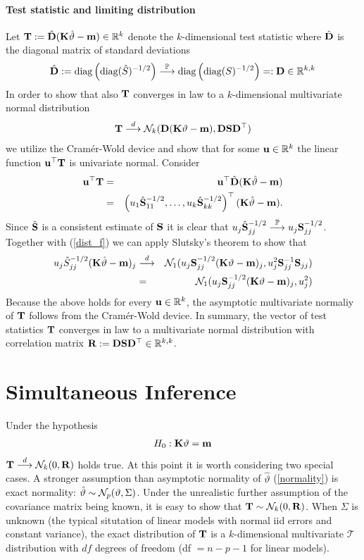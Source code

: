 \documentclass[12pt]{article}
\begin{document}
\paragraph{Test statistic and limiting distribution}

Let $\T := \hat{\D} (\K \hat{\vartheta} - \m) \in \R^k$ denote
the $k$-dimensional test statistic where $\hat{\D}$ is the diagonal
matrix of standard deviations
\begin{eqnarray*}
\hat{\D} := \text{diag}\left(\text{diag}(\hat{S})^{-1/2}\right) \cP 
\text{diag}\left(\text{diag}(S)^{-1/2}\right) =: \D \in \R^{k,k}
\end{eqnarray*}
In order to show that also $\T$ converges in law to a $k$-dimensional multivariate
normal distribution
\begin{eqnarray*}
\T \cL \N_k(\D(\K \vartheta - \m), \D \S \D^\top)
\end{eqnarray*}
we utilize the Cram{\'e}r-Wold device and show that for some $\u \in \R^k$ 
the linear function $\u^\top \T$ is univariate normal. Consider
\begin{eqnarray*}
\u^\top \T & = & \u^\top \hat{\D} (\K \hat{\vartheta} - \m) \\
& = & \left(u_1 \hat{\S}_{11}^{-1/2}, \dots, u_k \hat{\S}_{kk}^{-1/2}\right)^\top(\K \hat{\vartheta} - \m).
\end{eqnarray*}
Since $\hat{\S}$ is a consistent estimate of $\S$ it 
is clear that $u_j \hat{\S}_{jj}^{-1/2} \cP u_j \S_{jj}^{-1/2}$.
Together with (\ref{dist_f}) we can apply Slutsky's theorem to show that
\begin{eqnarray*}
u_j \hat{S}_{jj}^{-1/2} (\K \hat{\vartheta} - \m)_j & \cL &  
\N_1(u_j \S_{jj}^{-1/2} (\K \vartheta - \m)_j, u_j^2 \S_{jj}^{-1} \S_{jj}) \\
& = & \N_1(u_j \S_{jj}^{-1/2} (\K \vartheta - \m)_j, u_j^2)
\end{eqnarray*}
Because the above holds for every $\u \in \R^k$, the asymptotic multivariate
normaliy of $\T$ follows from the Cram{\'e}r-Wold device. In summary,
the vector of test statistics $\T$ converges in law to a multivariate
normal distribution with correlation matrix $\Cor := \D \S \D^\top \in \R^{k,k}$.

\section{Simultaneous Inference}

Under the hypothesis
\begin{eqnarray*}
H_0: \K \vartheta = \m
\end{eqnarray*}
$\T \cL \N_k(0, \Cor)$ holds true. At this point it is worth
considering two special cases. A stronger assumption than asymptotic normality
of $\hat{\vartheta}$ (\ref{normality}) is exact normality:
$\hat{\vartheta} \sim \N_p(\vartheta, \Sigma)$. Under the unrealistic
further assumption of the covariance matrix being known, it
is easy to show that $\T \sim \N_k(0, \Cor)$. 
When $\Sigma$ is unknown (the typical situtation of linear models
with normal iid errors and constant variance), the
exact distribution of $\T$ is a $k$-dimensional multivariate $\mathcal{T}$
distribution with $df$ degrees of freedom (df $ = n - p - 1$ for linear models).
\end{document}
